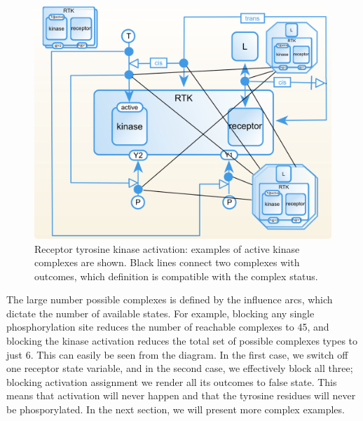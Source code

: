 \begin{figure}[H]
  \centering
  \vspace*{-0.75em}
  \includegraphics[scale=0.75]{examples/rtk-complex.png}
   \caption{Receptor tyrosine kinase activation: examples of active kinase complexes are shown. Black lines connect two complexes with outcomes, which definition is compatible with the complex status.}
  \label{fig:rtk-complexes}
\end{figure}

The large number  possible complexes is defined by the influence arcs, which dictate the number of available states. For example, blocking any single phosphorylation site reduces the number of reachable complexes to 45, and blocking the kinase activation reduces the total set of possible complexes types to just 6. This can easily be seen from the diagram. In the first case, we switch off one receptor state variable, and in the second case, we effectively block all three; blocking activation assignment we render all its outcomes to false state. This means that activation will never happen and that the tyrosine residues will never be phosporylated. In the next section, we will present more complex examples. 
